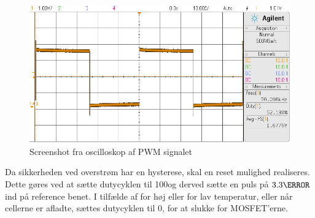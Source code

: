 \begin{figure}[h]
	\centering
	\includegraphics[width=15cm]{billeder/pwm_scope.png}
	\caption{Screenshot fra oscilloskop af PWM signalet}
	\label{fig:pwm_scope}
\end{figure}

Da sikkerheden ved overstrøm har en hysterese, skal en reset mulighed realiseres. Dette gøres ved at sætte dutycyklen til 100\percent\space og derved sætte en puls på $3.3\volt$ ind på reference benet. I tilfælde af for høj eller for lav temperatur, eller når cellerne er afladte, sættes dutycyklen til 0\percent, for at slukke for MOSFET'erne.

